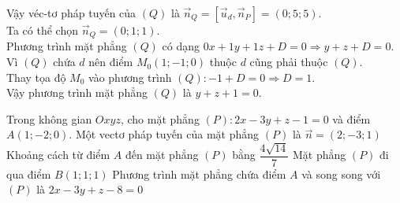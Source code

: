\begin{ex}
{\begin{itemchoice}
			Vậy véc-tơ pháp tuyến của $(Q)$ là $\overrightarrow{n}_Q=[\overrightarrow{u}_d,\overrightarrow{n}_P]=(0; 5; 5)$.\\ 
			Ta có thể  chọn $\overrightarrow{n}_Q=(0; 1;1)$.\\
			Phương trình mặt phẳng $(Q)$  có dạng $0x+1y+1z+D=0\Rightarrow y+z+D=0$.\\
			Vì $(Q)$ chứa $d$ nên  điểm $M_0(1;-1; 0)$ thuộc $d$ cũng phải thuộc $(Q)$.\\
			Thay tọa  độ $M_0$ vào phương trình $(Q)\colon-1+D=0\Rightarrow D=1$.\\
			 Vậy phương trình mặt phẳng $(Q)$ là $y+z+1=0$.
		\end{itemchoice}
	 }
\end{ex}

\begin{ex}%
	Trong không  gian $Oxyz$, cho mặt phẳng $(P): 2 x-3 y+z-1=0$ và điểm $A(1;-2; 0)$.
	\choiceTF 
		{\True Một vectơ pháp tuyến của mặt  phẳng $(P)$ là $\overrightarrow{n}=(2;-3; 1)$}
		{Khoảng cách từ điểm $A$ đến mặt phẳng $(P)$ bằng  $\dfrac{4 \sqrt{14}}{7}$}
		{Mặt phẳng $(P)$ đi  qua điểm $B(1; 1; 1)$}
		{\True Phương trình mặt phẳng chứa  điểm $A$ và song song với $(P)$ là $2 x-3 y+z-8=0$}
\end{ex}

